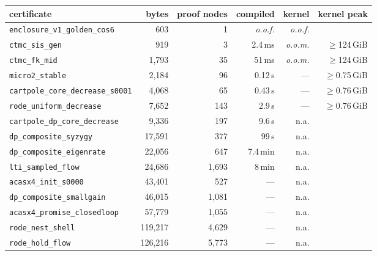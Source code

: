 {\setlength{\tabcolsep}{4pt}%
\begin{tabular}{@{}lrrrrr@{}}
\toprule
certificate & bytes & proof nodes & compiled & kernel & kernel peak \\
\midrule
\texttt{enclosure\_v1\_golden\_cos6} & 603 & 1 & \emph{o.o.f.} & \emph{o.o.f.} &  \\
\texttt{ctmc\_sis\_gen} & 919 & 3 & 2.4\,ms & \emph{o.o.m.} & $\geq$124\,GiB \\
\texttt{ctmc\_fk\_mid} & 1{,}793 & 35 & 51\,ms & \emph{o.o.m.} & $\geq$124\,GiB \\
\texttt{micro2\_stable} & 2{,}184 & 96 & 0.12\,s & --- & $\geq$0.75\,GiB \\
\texttt{cartpole\_core\_decrease\_s0001} & 4{,}068 & 65 & 0.43\,s & --- & $\geq$0.76\,GiB \\
\texttt{rode\_uniform\_decrease} & 7{,}652 & 143 & 2.9\,s & --- & $\geq$0.76\,GiB \\
\texttt{cartpole\_dp\_core\_decrease} & 9{,}336 & 197 & 9.6\,s & n.a. &  \\
\texttt{dp\_composite\_syzygy} & 17{,}591 & 377 & 99\,s & n.a. &  \\
\texttt{dp\_composite\_eigenrate} & 22{,}056 & 647 & 7.4\,min & n.a. &  \\
\texttt{lti\_sampled\_flow} & 24{,}686 & 1{,}693 & 8\,min & n.a. &  \\
\texttt{acasx4\_init\_s0000} & 43{,}401 & 527 & --- & n.a. &  \\
\texttt{dp\_composite\_smallgain} & 46{,}015 & 1{,}081 & --- & n.a. &  \\
\texttt{acasx4\_promise\_closedloop} & 57{,}779 & 1{,}055 & --- & n.a. &  \\
\texttt{rode\_nest\_shell} & 119{,}217 & 4{,}629 & --- & n.a. &  \\
\texttt{rode\_hold\_flow} & 126{,}216 & 5{,}773 & --- & n.a. &  \\
\bottomrule
\end{tabular}}
